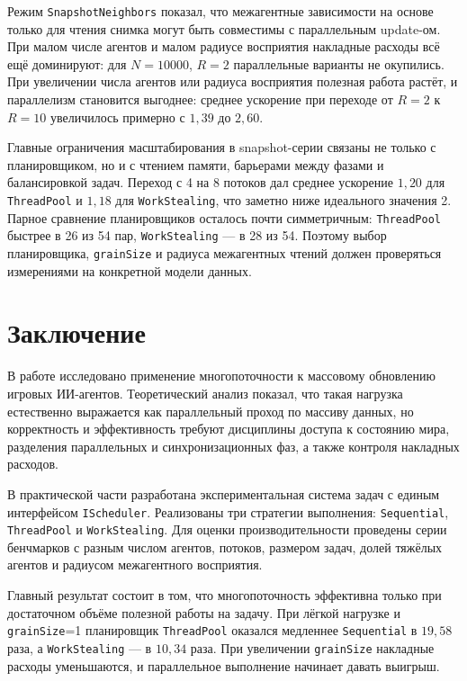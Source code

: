\documentclass[14pt,a4paper,oneside]{extreport}
\begin{document}
Режим \texttt{SnapshotNeighbors} показал, что межагентные зависимости на основе только для чтения снимка могут быть совместимы с параллельным update-ом. При малом числе агентов и малом радиусе восприятия накладные расходы всё ещё доминируют: для \(N=10000\), \(R=2\) параллельные варианты не окупились. При увеличении числа агентов или радиуса восприятия полезная работа растёт, и параллелизм становится выгоднее: среднее ускорение при переходе от \(R=2\) к \(R=10\) увеличилось примерно с \(1{,}39\) до \(2{,}60\).

Главные ограничения масштабирования в snapshot-серии связаны не только с планировщиком, но и с чтением памяти, барьерами между фазами и балансировкой задач. Переход с 4 на 8 потоков дал среднее ускорение \(1{,}20\) для \texttt{ThreadPool} и \(1{,}18\) для \texttt{WorkStealing}, что заметно ниже идеального значения 2. Парное сравнение планировщиков осталось почти симметричным: \texttt{ThreadPool} быстрее в 26 из 54 пар, \texttt{WorkStealing} --- в 28 из 54. Поэтому выбор планировщика, \texttt{grainSize} и радиуса межагентных чтений должен проверяться измерениями на конкретной модели данных.
\newpage
\section*{Заключение}

В работе исследовано применение многопоточности к массовому обновлению игровых ИИ-агентов. Теоретический анализ показал, что такая нагрузка естественно выражается как параллельный проход по массиву данных, но корректность и эффективность требуют дисциплины доступа к состоянию мира, разделения параллельных и синхронизационных фаз, а также контроля накладных расходов.

В практической части разработана экспериментальная система задач с единым интерфейсом \texttt{IScheduler}. Реализованы три стратегии выполнения: \texttt{Sequential}, \texttt{ThreadPool} и \texttt{WorkStealing}. Для оценки производительности проведены серии бенчмарков с разным числом агентов, потоков, размером задач, долей тяжёлых агентов и радиусом межагентного восприятия.

Главный результат состоит в том, что многопоточность эффективна только при достаточном объёме полезной работы на задачу. При лёгкой нагрузке и \texttt{grainSize}=1 планировщик \texttt{ThreadPool} оказался медленнее \texttt{Sequential} в \(19{,}58\) раза, а \texttt{WorkStealing} --- в \(10{,}34\) раза. При увеличении \texttt{grainSize} накладные расходы уменьшаются, и параллельное выполнение начинает давать выигрыш.
\end{document}
